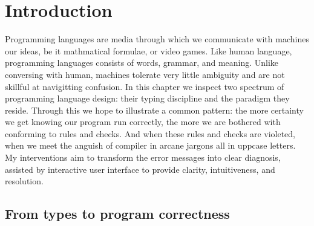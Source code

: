 
\chapter{Introduction}

\label{intro} 

\graphicspath{{Figures/Introduction}}

Programming languages are media through which we communicate with machines our ideas, be it mathmatical formulae, or video games. Like human language, programming languages consists of words, grammar, and meaning. Unlike conversing with human, machines tolerate very little ambiguity and are not skillful at navigitting confusion. In this chapter we inspect two spectrum of programming language design: their typing discipline and the paradigm they reside. Through this we hope to illustrate a common pattern: the more certainty we get knowing our program run correctly, the more we are bothered with conforming to rules and checks. And when these rules and checks are violeted, when we meet the anguish of compiler in arcane jargons all in uppcase letters. My interventions aim to transform the error messages into clear diagnosis, assisted by interactive user interface to provide clarity, intuitiveness, and resolution.   


\section{From types to program correctness}

